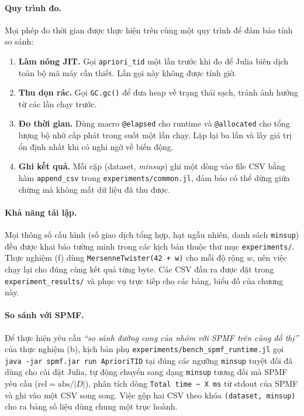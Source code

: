 \paragraph{Quy trình đo.} Mọi phép đo thời gian được thực hiện trên cùng một quy trình để đảm bảo tính so sánh:
\begin{enumerate}
    \item \textbf{Làm nóng JIT.} Gọi \texttt{apriori\_tid} một lần trước khi đo để Julia biên dịch toàn bộ mã máy cần thiết. Lần gọi này không được tính giờ.
    \item \textbf{Thu dọn rác.} Gọi \texttt{GC.gc()} để đưa heap về trạng thái sạch, tránh ảnh hưởng từ các lần chạy trước.
    \item \textbf{Đo thời gian.} Dùng macro \texttt{@elapsed} cho runtime và \texttt{@allocated} cho tổng lượng bộ nhớ cấp phát trong suốt một lần chạy. Lặp lại ba lần và lấy giá trị ổn định nhất khi có nghi ngờ về biến động.
    \item \textbf{Ghi kết quả.} Mỗi cặp (dataset, \textit{minsup}) ghi một dòng vào file CSV bằng hàm \texttt{append\_csv} trong \texttt{experiments/common.jl}, đảm bảo có thể dừng giữa chừng mà không mất dữ liệu đã thu được.
\end{enumerate}

\paragraph{Khả năng tái lập.} Mọi thông số cấu hình (số giao dịch tổng hợp, hạt ngẫu nhiên, danh sách \texttt{minsup}) đều được khai báo tường minh trong các kịch bản thuộc thư mục \texttt{experiments/}. Thực nghiệm (f) dùng \texttt{MersenneTwister(42 + w)} cho mỗi độ rộng $w$, nên việc chạy lại cho đúng cùng kết quả từng byte. Các CSV đầu ra được đặt trong \texttt{experiment\_results/} và phục vụ trực tiếp cho các bảng, biểu đồ của chương này.

\paragraph{So sánh với SPMF.} Để thực hiện yêu cầu \emph{``so sánh đường cong của nhóm với SPMF trên cùng đồ thị''} của thực nghiệm (b), kịch bản phụ \texttt{experiments/bench\_spmf\_runtime.jl} gọi \texttt{java -jar spmf.jar run AprioriTID} tại đúng các ngưỡng \texttt{minsup} tuyệt đối đã dùng cho cài đặt Julia, tự động chuyển sang dạng \texttt{minsup} tương đối mà SPMF yêu cầu ($\text{rel} = \text{abs} / |D|$), phân tích dòng \texttt{Total time \~{} X ms} từ stdout của SPMF và ghi vào một CSV song song. Việc gộp hai CSV theo khóa \texttt{(dataset, minsup)} cho ra bảng số liệu dùng chung một trục hoành.

